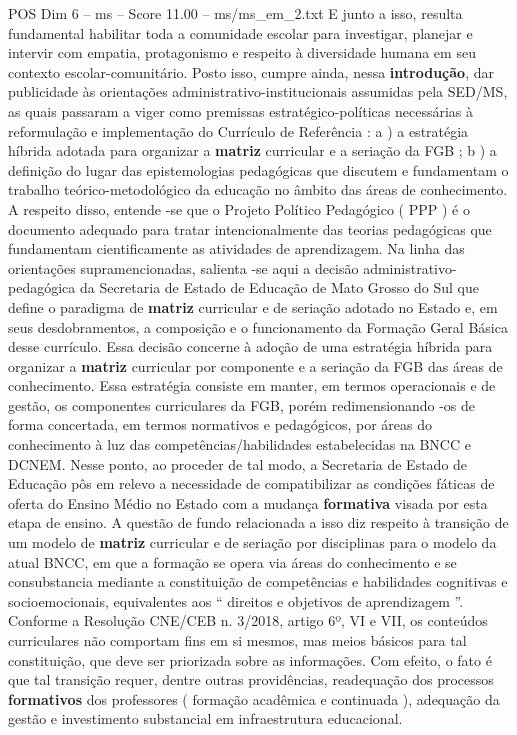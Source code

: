 \begin{textsample}{POS Dim 6 – ms – Score 11.00 – ms/ms\_em\_2.txt}
E junto a isso, resulta fundamental habilitar toda a comunidade escolar para investigar, planejar e intervir com empatia, protagonismo e respeito à diversidade humana em seu contexto escolar-comunitário.
Posto isso, cumpre ainda, nessa \textbf{introdução}, dar publicidade às orientações administrativo-institucionais assumidas pela SED/MS, as quais passaram a viger como premissas estratégico-políticas necessárias à reformulação e implementação do Currículo de Referência : a ) a estratégia híbrida adotada para organizar a \textbf{matriz} curricular e a seriação da FGB ; b ) a definição do lugar das epistemologias pedagógicas que discutem e fundamentam o trabalho teórico-metodológico da educação no âmbito das áreas de conhecimento.
A respeito disso, entende -se que o Projeto Político Pedagógico ( PPP ) é o documento adequado para tratar intencionalmente das teorias pedagógicas que fundamentam cientificamente as atividades de aprendizagem.
Na linha das orientações supramencionadas, salienta -se aqui a decisão administrativo-pedagógica da Secretaria de Estado de Educação de Mato Grosso do Sul que define o paradigma de \textbf{matriz} curricular e de seriação adotado no Estado e, em seus desdobramentos, a composição e o funcionamento da Formação Geral Básica desse currículo.
Essa decisão concerne à adoção de uma estratégia híbrida para organizar a \textbf{matriz} curricular por componente e a seriação da FGB das áreas de conhecimento.
Essa estratégia consiste em manter, em termos operacionais e de gestão, os componentes curriculares da FGB, porém redimensionando -os de forma concertada, em termos normativos e pedagógicos, por áreas do conhecimento à luz das competências/habilidades estabelecidas na BNCC e DCNEM.
Nesse ponto, ao proceder de tal modo, a Secretaria de Estado de Educação pôs em relevo a necessidade de compatibilizar as condições fáticas de oferta do Ensino Médio no Estado com a mudança \textbf{formativa} visada por esta etapa de ensino.
A questão de fundo relacionada a isso diz respeito à transição de um modelo de \textbf{matriz} curricular e de seriação por disciplinas para o modelo da atual BNCC, em que a formação se opera via áreas do conhecimento e se consubstancia mediante a constituição de competências e habilidades cognitivas e socioemocionais, equivalentes aos “ direitos e objetivos de aprendizagem ”.
Conforme a Resolução CNE/CEB n. 3/2018, artigo 6º, VI e VII, os conteúdos curriculares não comportam fins em si mesmos, mas meios básicos para tal constituição, que deve ser priorizada sobre as informações.
Com efeito, o fato é que tal transição requer, dentre outras providências, readequação dos processos \textbf{formativos} dos professores ( formação acadêmica e continuada ), adequação da gestão e investimento substancial em infraestrutura educacional.

\end{textsample}
